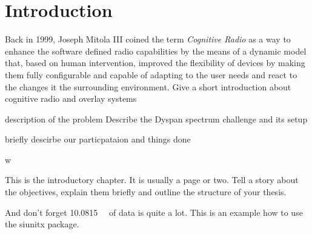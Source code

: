 \chapter{Introduction}

Back in 1999, Joseph Mitola III coined the term \emph{Cognitive Radio}\cite{mit99} as a way to enhance the software defined radio capabilities by the means of a dynamic model that, based on human intervention, improved the flexibility of devices by making them fully configurable and capable of adapting to the user needs and react to the changes it the surrounding environment.
Give a short introduction about cognitive radio and overlay systems

description of the problem
Describe the Dyspan spectrum challenge and its setup

briefly descirbe our particpataion and things done


 w






This is the introductory chapter.
It is usually a page or two.
Tell a story about the objectives, explain them briefly and outline the structure of your thesis.

And don't forget \SI{10.0815}{\giga\byte} of data is quite a lot.
This is an example how to use the siunitx package.
